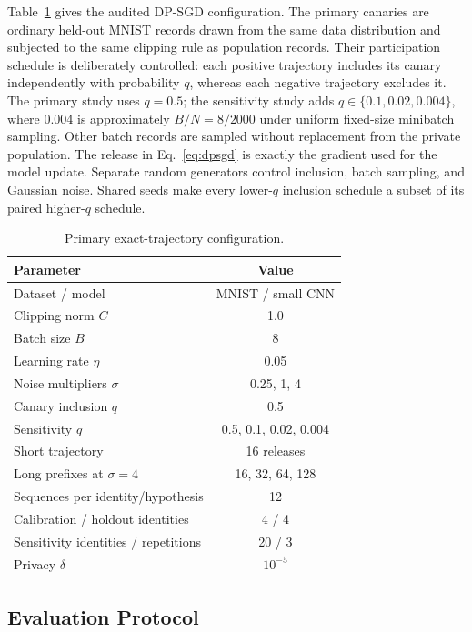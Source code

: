 \documentclass[conference]{IEEEtran}
\begin{document}
Table~\ref{tab:setup} gives the audited DP-SGD configuration. The primary canaries are ordinary held-out MNIST records drawn from the same data distribution and subjected to the same clipping rule as population records. Their participation schedule is deliberately controlled: each positive trajectory includes its canary independently with probability $q$, whereas each negative trajectory excludes it. The primary study uses $q=0.5$; the sensitivity study adds $q\in\{0.1,0.02,0.004\}$, where 0.004 is approximately $B/N=8/2000$ under uniform fixed-size minibatch sampling. Other batch records are sampled without replacement from the private population. The release in Eq.~\ref{eq:dpsgd} is exactly the gradient used for the model update. Separate random generators control inclusion, batch sampling, and Gaussian noise. Shared seeds make every lower-$q$ inclusion schedule a subset of its paired higher-$q$ schedule.

\begin{table}[t]
\caption{Primary exact-trajectory configuration.}
\label{tab:setup}
\centering
\begin{tabular}{lc}
\toprule
Parameter & Value \\
\midrule
Dataset / model & MNIST / small CNN \\
Clipping norm $C$ & 1.0 \\
Batch size $B$ & 8 \\
Learning rate $\eta$ & 0.05 \\
Noise multipliers $\sigma$ & 0.25, 1, 4 \\
Canary inclusion $q$ & 0.5 \\
Sensitivity $q$ & 0.5, 0.1, 0.02, 0.004 \\
Short trajectory & 16 releases \\
Long prefixes at $\sigma=4$ & 16, 32, 64, 128 \\
Sequences per identity/hypothesis & 12 \\
Calibration / holdout identities & 4 / 4 \\
Sensitivity identities / repetitions & 20 / 3 \\
Privacy $\delta$ & $10^{-5}$ \\
\bottomrule
\end{tabular}
\end{table}

\subsection{Evaluation Protocol}
\end{document}

